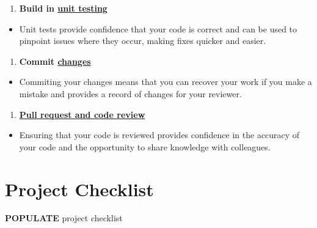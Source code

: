 \documentclass[]{book}
\providecommand{\tightlist}{%
  \setlength{\itemsep}{0pt}\setlength{\parskip}{0pt}}
\begin{document}
\begin{enumerate}
\def\labelenumi{\arabic{enumi}.}
\setcounter{enumi}{4}
\tightlist
\item
  \textbf{Build in \protect\hyperlink{unittest}{unit testing}}\\
\end{enumerate}

\begin{itemize}
\tightlist
\item
  Unit tests provide confidence that your code is correct and can be used to pinpoint issues where they occur, making fixes quicker and easier.\\
\end{itemize}

\begin{enumerate}
\def\labelenumi{\arabic{enumi}.}
\setcounter{enumi}{5}
\tightlist
\item
  \textbf{Commit \protect\hyperlink{versioncontrol}{changes}}\\
\end{enumerate}

\begin{itemize}
\tightlist
\item
  Commiting your changes means that you can recover your work if you make a mistake and provides a record of changes for your reviewer.\\
\end{itemize}

\begin{enumerate}
\def\labelenumi{\arabic{enumi}.}
\setcounter{enumi}{6}
\tightlist
\item
  \textbf{\protect\hyperlink{review}{Pull request and code review}}\\
\end{enumerate}

\begin{itemize}
\tightlist
\item
  Ensuring that your code is reviewed provides confidence in the accuracy of your code and the opportunity to share knowledge with colleagues.
\end{itemize}

\hypertarget{checklist}{%
\chapter{Project Checklist}\label{checklist}}

\textbf{POPULATE} project checklist
\end{document}
